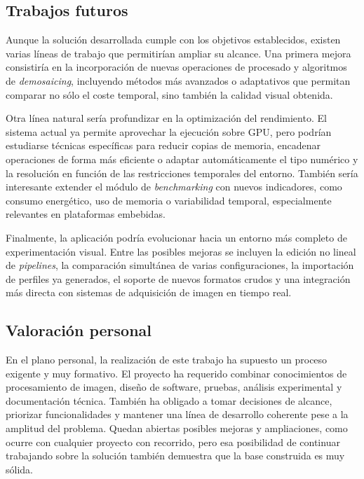 \subsection{Trabajos futuros} \label{subsec:conclusiones_trabajo_futuro}

Aunque la solución desarrollada cumple con los objetivos establecidos, existen varias líneas de trabajo
que permitirían ampliar su alcance. Una primera mejora consistiría en la incorporación de nuevas operaciones de
procesado y algoritmos de \textit{demosaicing}, incluyendo métodos más avanzados o adaptativos que
permitan comparar no sólo el coste temporal, sino también la calidad visual obtenida.

Otra línea natural sería profundizar en la optimización del rendimiento. El sistema actual ya permite
aprovechar la ejecución sobre GPU, pero podrían estudiarse técnicas específicas para reducir copias de
memoria, encadenar operaciones de forma más eficiente o adaptar automáticamente el tipo numérico y la
resolución en función de las restricciones temporales del entorno. También sería interesante extender el
módulo de \textit{benchmarking} con nuevos indicadores, como consumo energético, uso de memoria o
variabilidad temporal, especialmente relevantes en plataformas embebidas.

Finalmente, la aplicación podría evolucionar hacia un entorno más completo de experimentación visual.
Entre las posibles mejoras se incluyen la edición no lineal de \textit{pipelines}, la comparación simultánea
de varias configuraciones, la importación de perfiles ya generados, el soporte de nuevos formatos crudos
y una integración más directa con sistemas de adquisición de imagen en tiempo real.

\newpage

\subsection{Valoración personal} \label{subsec:conclusiones_valoracion_personal}

En el plano personal, la realización de este trabajo ha supuesto un proceso exigente y muy formativo. El
proyecto ha requerido combinar conocimientos de procesamiento de imagen, diseño de software, pruebas, análisis experimental 
y documentación técnica. También ha obligado a tomar decisiones
de alcance, priorizar funcionalidades y mantener una línea de desarrollo coherente pese a la amplitud del
problema. Quedan abiertas posibles mejoras y ampliaciones, como ocurre con
cualquier proyecto con recorrido, pero esa posibilidad de continuar trabajando sobre la solución también
demuestra que la base construida es muy sólida.

